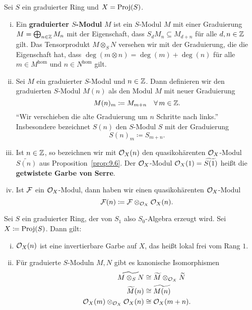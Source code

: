 \begin{defn}
\label{defn:11.11}
	Sei $S$ ein graduierter Ring und $X = \operatorname{Proj}(S)$.
	\begin{enumerate}[i)]
		\item Ein \textbf{graduierter $S$-Modul} $M$ ist ein $S$-Modul $M$ mit einer Graduierung $M=\bigoplus_{n\in \mathbb {Z}}M_n$ mit der Eigenschaft, dass $S_dM_n \subseteq M_{d+n}$ für alle $d,n  \in \mathbb {Z}$ gilt. Das Tensorprodukt $M\otimes_S N$ versehen wir mit der Graduierung, die die Eigenschaft hat, dass $\deg(m\otimes n) = \deg(m)+\deg(n)$ für alle $m \in M^\text{hom}$ und $n \in N^\text{hom}$ gilt.
		\item Sei $M$ ein graduierter $S$-Modul und $n \in \mathbb {Z}$. Dann definieren wir den graduierten $S$-Modul $M(n)$ als den Modul $M$ mit neuer Graduierung
			\[
				M(n)_m \coloneqq M_{m+n} \quad \forall\, m \in \mathbb {Z}.
			\]
			\enquote{Wir verschieben die alte Graduierung um $n$ Schritte nach links.} Insbesondere bezeichnet $S(n)$ den $S$-Modul $S$ mit der Graduierung
			\[
				S(n)_m\coloneqq S_{m+n}.
			\]
		\item Ist $n \in \mathbb {Z}$, so bezeichnen wir mit $\mathcal{O}_X(n)$ den quasikohärenten $\mathcal{O}_X$-Modul $\widetilde{S(n)}$ aus Proposition~\ref{prop:9.6}. Der $\mathcal{O}_X$-Modul $\mathcal{O}_X(1) = \widetilde{S(1)}$ heißt die \textbf{getwistete Garbe von Serre}.
		\item Ist $\mathcal{F}$ ein $\mathcal{O}_X$-Modul, dann haben wir einen quasikohärenten $\mathcal{O}_X$-Modul
			\[ \mathcal{F}(n)\coloneqq \mathcal{F} \otimes_{\mathcal{O}_X}\mathcal{O}_X(n)  . \]
	\end{enumerate}
\end{defn}

\begin{prop}
\label{prop:11.12}
	Sei $S$ ein graduierter Ring, der von $S_1$ also $S_0$-Algebra erzeugt wird. Sei $X\coloneqq \operatorname{Proj}(S)$. Dann gilt:
	\begin{enumerate}[i)]
		\item $\mathcal{O}_X(n)$ ist eine invertierbare Garbe auf $X$, das heißt lokal frei vom Rang $1$.
		\item Für graduierte $S$-Moduln $M,N$ gibt es kanonische Isomorphismen
		\begin{align*}
			\widetilde{M\otimes_S N} & \cong \widetilde{M}\otimes_{\mathcal{O}_X} \widetilde{N}\\
			\widetilde{M}(n) & \cong \widetilde{M(n)}\\
			\mathcal{O}_X(m)\otimes_{\mathcal{O}_X} \mathcal{O}_X(n) &\cong \mathcal{O}_X(m+n).
		\end{align*}
	\end{enumerate}
\end{prop}

